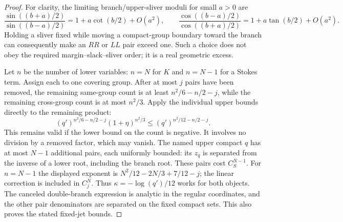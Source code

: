 \documentclass[11pt]{article}
\numberwithin{equation}{section}
\theoremstyle{definition}
\begin{document}
\begin{proof}
For clarity, the limiting branch/upper-sliver moduli for small
\(a>0\) are
\[
 \frac{\sin((b+a)/2)}{\sin((b-a)/2)}
   =1+a\cot(b/2)+O(a^2),\qquad
 \frac{\cos((b-a)/2)}{\cos((b+a)/2)}
   =1+a\tan(b/2)+O(a^2).
\]
Holding a sliver fixed while moving a compact-group boundary
toward the branch can consequently make an \(RR\) or \(LL\)
pair exceed one. Such a choice does not obey the required
margin--slack--sliver order; it is a real geometric excess.

Let \(n\) be the number of lower variables: \(n=N\) for \(K\)
and \(n=N-1\) for a Stokes term. Assign each to one covering group.
After at most \(j\) pairs have been removed, the remaining
same-group count is at least \(n^2/6-n/2-j\), while the
remaining cross-group count is at most \(n^2/3\). Apply the
individual upper bounds directly to the remaining product:
\[
 (q')^{n^2/6-n/2-j}(1+\eta)^{n^2/3}
       \le(q')^{n^2/12-n/2-j}.
\]
This remains valid if the lower bound on the count is negative.
It involves no division by a removed factor, which may vanish.
The named upper compact
\(q\) has at most \(N-1\) additional pairs, each uniformly
bounded: its \(z_q\) is separated from the inverse of a lower
root, including the branch root. These pairs cost \(C_S^{N-1}\).
For \(n=N-1\) the displayed exponent is
\(N^2/12-2N/3+7/12-j\); the linear correction is included in
\(C_j^N\). Thus \(\kappa=-\log(q')/12\) works for both objects.
The canceled double-branch expression is analytic in the regular
coordinates, and the other pair denominators are separated on the
fixed compact sets. This also proves the stated fixed-jet bounds.
\end{proof}
\end{document}
